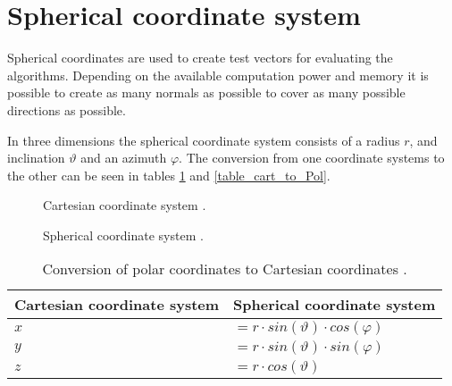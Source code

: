 \section{Spherical coordinate system}
\label{spend_sphere}
Spherical coordinates are used to create test vectors for evaluating the algorithms. Depending on the available computation power and memory it is possible to create as many normals as possible to cover as many possible directions as possible.

\bigskip
In three dimensions the spherical coordinate system consists of a radius $r$, and inclination $\vartheta$ and an azimuth $\varphi$. The conversion from one coordinate systems to the other can be seen in tables \ref{table_pol_to_cart} and \ref{table_cart_to_Pol}.

\begin{figure}[H]
  \centering
  \begin{minipage}[b]{0.45\textwidth}
    \centering
  \caption{Cartesian coordinate system \cite{Prof.Dr.-Ing.GertF.Trommer2013FelderWellen}.}
  \end{minipage}
  \hfill
  \begin{minipage}[b]{0.45\textwidth}
    \centering
  \caption{Spherical coordinate system \cite{Prof.Dr.-Ing.GertF.Trommer2013FelderWellen}.}
  \end{minipage}
    \hfill
\label{polar_cart_systems}
\end{figure}




\begin{table}[H]
\centering
\begin{tabular}{|ll|}
\hline
\textbf{Cartesian coordinate system} & \textbf{Spherical coordinate system}                                                                            \\ \hline
$x $                            & $= r \cdot sin(\vartheta) \cdot cos(\varphi)$ \\
$y $                            & $= r \cdot sin(\vartheta) \cdot sin(\varphi)$ \\
$z $                            & $= r \cdot cos(\vartheta)$                                                  \\ \hline
\end{tabular}
\caption{Conversion of polar coordinates to Cartesian coordinates  \cite{Bronstein2005TaschenbuchMathematik}.}
\label{table_pol_to_cart}
\end{table}


